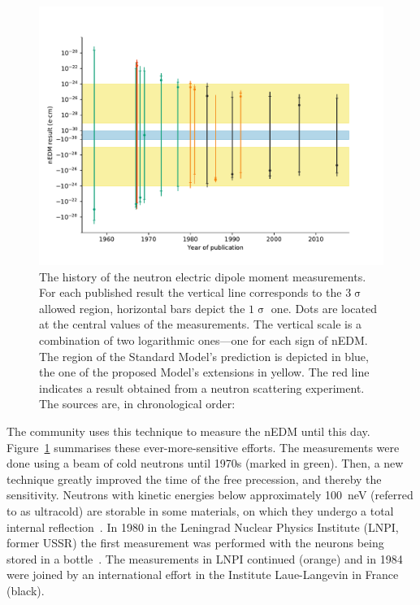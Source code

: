 \begin{figure}
  \centering
  \includegraphics[width=\linewidth]{gfx/introduction/edm_limits.pdf}
  \caption{The history of the neutron electric dipole moment measurements. For each published result the vertical line corresponds to the $3\upsigma$ allowed region, horizontal bars depict the $1\upsigma$ one. Dots are located at the central values of the measurements. The vertical scale is a combination of two logarithmic ones---one for each sign of nEDM. The region of the Standard Model's prediction is depicted in blue, the one of the proposed Model's extensions in yellow. The red line indicates a result obtained from a neutron scattering experiment. The sources are, in chronological order:~\cite{PhysRev.108.120,PhysRevLett.19.381,PhysRevLett.19.384,PhysRev.170.1200,PhysRev.179.1285,PhysRevD.7.3147,PhysRevD.15.9,ALTAREV1980269,ALTAREV198113,altarev1986search,ALTAREV1992242,PENDLEBURY1984327,SMITH1990191,PhysRevLett.82.904,PhysRevLett.97.131801}}
  \label{fig:nEDM_limits_history}
\end{figure}

The community uses this technique to measure the nEDM until this day. Figure~\ref{fig:nEDM_limits_history} summarises these ever-more-sensitive efforts. The measurements were done using a beam of cold neutrons until 1970s (marked in green). Then, a new technique greatly improved the time of the free precession, and thereby the sensitivity. Neutrons with kinetic energies below approximately \SI{100}{\nano\electronvolt} (referred to as ultracold) are storable in some materials, on which they undergo a total internal reflection~\cite{UCNbook}. In 1980 in the Leningrad Nuclear Physics Institute (LNPI, former USSR) the first measurement was performed with the neurons being stored in a bottle~\cite{ALTAREV1980269}. The measurements in LNPI continued (orange) and in 1984 were joined by an international effort in the Institute Laue-Langevin in France (black).

